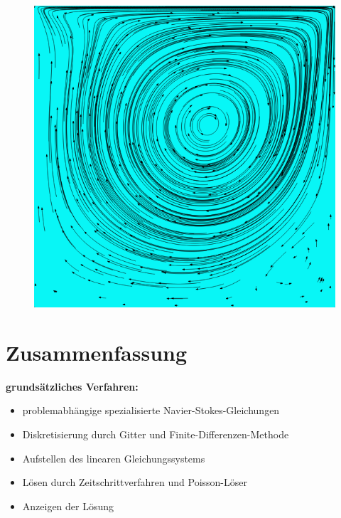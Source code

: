 		\begin{frame}
			\begin{figure}
				\centering
				\includegraphics[scale=0.4]{images/re-1000-512-12475.png}
			\end{figure}
		\end{frame}


	\section{Zusammenfassung} %
	\label{sec:zusammenfassung}

		\begin{frame}
			\textbf{grundsätzliches Verfahren:}
			\begin{itemize}[label=$\circ$]
				\item problemabhängige spezialisierte Navier-Stokes-Gleichungen
				\item Diskretisierung durch Gitter und Finite-Differenzen-Methode
				\item Aufstellen des linearen Gleichungssystems
				\item Lösen durch Zeitschrittverfahren und Poisson-Löser
				\item Anzeigen der Lösung
			\end{itemize}
		\end{frame}

